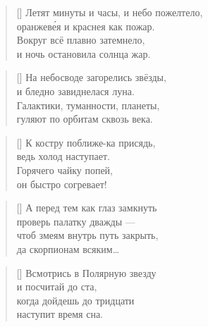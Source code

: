 \documentclass[a5paper,11pt]{memoir}
\begin{document}
\begin{verse}[\versewidth]
Летят минуты и часы, и небо пожелтело, \\
оранжев\'{е}я и краснея как пожар. \\
Вокруг всё плавно затемнело, \\
и ночь остановила солнца жар.
\end{verse}

\begin{verse}[\versewidth]
На небосводе загорелись звёзды, \\
и бледно завиднелася луна. \\
Галактики, туманности, планеты, \\
гуляют по орбитам сквозь века.
\end{verse}


\begin{verse}[\versewidth]
К костру поближе-ка присядь, \\
ведь холод наступает. \\
Горячего чайку попей, \\
он быстро согревает!
\end{verse}
\clearpage

\null  %
\hfill
\vspace{5cm}
\begin{verse}[\versewidth]
\hspace{-3cm}А перед тем как глаз замкнуть \\
\hspace{-3cm}проверь палатку дважды --- \\
\hspace{-3cm}чтоб змеям внутрь путь закрыть, \\
\hspace{-3cm}да скорпионам всяким\ldots
\end{verse}


\vspace{1cm}
\begin{verse}[\versewidth]
\hspace{4cm}Всмотрись в Полярную звезду \\
\hspace{4cm}и посчитай до ста, \\
\hspace{4cm}когда дойдешь до тридцати \\
\hspace{4cm}наступит время сна.
\end{verse}
\end{document}
